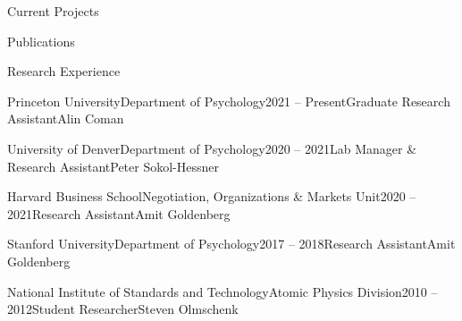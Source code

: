 \documentclass{cv} %
\begin{document}

\nocite{*}
\begin{cvSectionEmpty}{Current Projects}
  \printbibliography[
    heading=none,
    keyword=in-prep
  ]
\end{cvSectionEmpty}

\begin{cvSectionEmpty}{Publications}
  \printbibliography[
    heading=none,
    keyword=publications
  ]
\end{cvSectionEmpty}


\begin{cvSection}{Research Experience}

  \begin{cvSubsectionResearch}{Princeton University}{Department of Psychology}{2021 -- Present}{Graduate Research Assistant}{Alin Coman}
  \end{cvSubsectionResearch}

  \begin{cvSubsectionResearch}{University of Denver}{Department of Psychology}{2020 -- 2021}{Lab Manager \& Research Assistant}{Peter Sokol-Hessner}
  \end{cvSubsectionResearch}

  \begin{cvSubsectionResearch}
    {Harvard Business School}{Negotiation, Organizations \& Markets Unit}{2020 -- 2021}{Research Assistant}{Amit Goldenberg}
  \end{cvSubsectionResearch}

  \begin{cvSubsectionResearch}{Stanford University}{Department of Psychology}{2017 -- 2018}{Research Assistant}{Amit Goldenberg}
  \end{cvSubsectionResearch}

  \begin{cvSubsectionResearch}{National Institute of Standards and Technology}{Atomic Physics Division}{2010 -- 2012}{Student Researcher}{Steven Olmschenk}
  \end{cvSubsectionResearch}

\end{cvSection}
\end{document}
